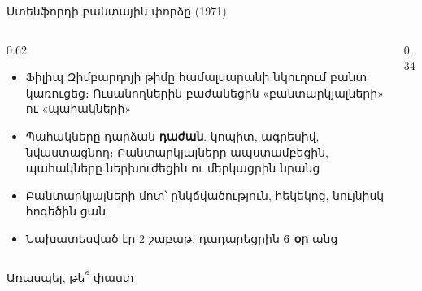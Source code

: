 \begin{frame}{Ստենֆորդի բանտային փորձը (1971)}
  \begin{columns}[c]
    \begin{column}{0.62\textwidth}
      \begin{itemize}
        \item Ֆիլիպ Զիմբարդոյի թիմը համալսարանի նկուղում բանտ կառուցեց։ Ուսանողներին բաժանեցին «բանտարկյալների» ու «պահակների»
        \item<2-> Պահակները դարձան \textbf{դաժան}. կոպիտ, ագրեսիվ, նվաստացնող։ Բանտարկյալները ապստամբեցին, պահակները ներխուժեցին ու մերկացրին նրանց
        \item<3-> Բանտարկյալների մոտ՝ ընկճվածություն, հեկեկոց, նույնիսկ հոգեծին ցան
        \item<4-> Նախատեսված էր 2 շաբաթ, դադարեցրին \textbf{6 օր} անց
      \end{itemize}
    \end{column}
    \begin{column}{0.34\textwidth}
      \centering
      \ \par\medskip
    \end{column}
  \end{columns}
\end{frame}

\begin{frame}{Առասպել, թե՞ փաստ}
\end{frame}

